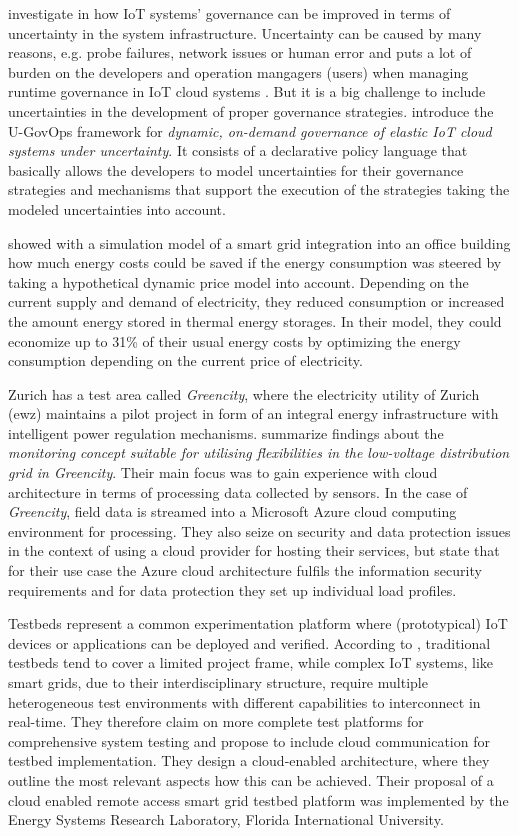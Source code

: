 \citeauthor{7396147} investigate in how IoT systems' governance can be improved in terms of uncertainty in the system infrastructure. Uncertainty can be caused by many reasons, e.g. probe failures, network issues or human error and puts a lot of burden on the developers and operation mangagers (users) when managing runtime governance in IoT cloud systems \cite{7396147}. But it is a big challenge to include uncertainties in the development of proper governance strategies. \citeauthor{7396147} introduce the U-GovOps framework for \textit{dynamic, on-demand governance of elastic IoT cloud systems under uncertainty}. It consists of a declarative policy language that basically allows the developers to model uncertainties for their governance strategies and mechanisms that support the execution of the strategies taking the modeled uncertainties into account.

\citeauthor{bornhoft2013simulation} showed with a simulation model of a smart grid integration into an office building how much energy costs could be saved if the energy consumption was steered by taking a hypothetical dynamic price model into account. Depending on the current supply and demand of electricity, they reduced consumption or increased the amount energy stored in thermal energy storages. In their model, they could economize up to 31\% of their usual energy costs by optimizing the energy consumption depending on the current price of electricity.

Zurich has a test area called \textit{Greencity}, where the electricity utility of Zurich (ewz) maintains a pilot project in form of an integral energy infrastructure with intelligent power regulation mechanisms. \citeauthor{baumgartner2020monitoring} summarize findings about the \textit{monitoring concept suitable for utilising flexibilities in the low-voltage distribution grid in Greencity}. Their main focus was to gain experience with cloud architecture in terms of processing data collected by sensors. In the case of \textit{Greencity}, field data is streamed into a Microsoft Azure cloud computing environment for processing. They also seize on security and data protection issues in the context of using a cloud provider for hosting their services, but state that for their use case the Azure cloud architecture fulfils the information security requirements and for data protection they set up individual load profiles.

Testbeds represent a common experimentation platform where (prototypical) IoT devices or applications can be deployed and verified. According to \citeauthor{cintuglu2016cloud}, traditional testbeds tend to cover a limited project frame, while complex IoT systems, like smart grids, due to their interdisciplinary structure, require multiple heterogeneous test environments with different capabilities to interconnect in real-time. They therefore claim on more complete test platforms for comprehensive system testing and propose to include cloud communication for testbed implementation. They design a cloud-enabled architecture, where they outline the most relevant aspects how this can be achieved. Their proposal of a cloud enabled remote access smart grid testbed platform was implemented by the Energy Systems Research Laboratory, Florida International University.


